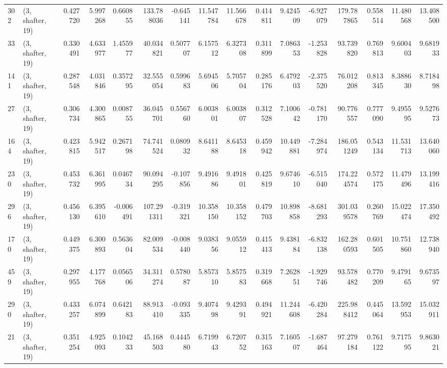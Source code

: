 \begin{tabular}{llrrrrrrrrrrrrrr}
302 &  (3, shafter, 19) &   0.427720 &   5.997268 &   0.660855 &   133.788036 &  -0.645141 &  11.547784 &  11.566678 &  0.414811 &   9.424509 &  -6.927079 &   179.787865 &   0.558514 &  11.480568 &  13.408500 \\
33  &  (3, shafter, 19) &   0.330491 &   4.633977 &   1.455977 &    40.034821 &   0.507707 &   6.157512 &   6.327308 &  0.311899 &   7.086353 &  -1.253828 &    93.739820 &   0.769813 &   9.600403 &   9.681933 \\
141 &  (3, shafter, 19) &   0.287548 &   4.031846 &   0.357295 &    32.555054 &   0.599683 &   5.694506 &   5.705704 &  0.285176 &   6.479203 &  -2.375520 &    76.012208 &   0.813345 &   8.388630 &   8.718498 \\
27  &  (3, shafter, 19) &   0.306734 &   4.300865 &   0.008755 &    36.045701 &   0.556760 &   6.003801 &   6.003807 &  0.312528 &   7.100642 &  -0.781170 &    90.776557 &   0.777090 &   9.495595 &   9.527673 \\
164 &  (3, shafter, 19) &   0.423815 &   5.942517 &   0.267198 &    74.741524 &   0.080932 &   8.641188 &   8.645318 &  0.459942 &  10.449881 &  -7.284974 &   186.051249 &   0.543134 &  11.531713 &  13.640060 \\
230 &  (3, shafter, 19) &   0.453732 &   6.361995 &   0.046734 &    90.094295 &  -0.107856 &   9.491686 &   9.491801 &  0.425819 &   9.674610 &  -6.515040 &   174.224574 &   0.572175 &  11.479496 &  13.199416 \\
296 &  (3, shafter, 19) &   0.456130 &   6.395610 &  -0.006491 &   107.291311 &  -0.319321 &  10.358150 &  10.358152 &  0.479703 &  10.898858 &  -8.681293 &   301.039578 &   0.260769 &  15.022474 &  17.350492 \\
170 &  (3, shafter, 19) &   0.449375 &   6.300893 &   0.563604 &    82.009534 &  -0.008440 &   9.038356 &   9.055912 &  0.415413 &   9.438184 &  -6.832138 &   162.280593 &   0.601505 &  10.751860 &  12.738940 \\
459 &  (3, shafter, 19) &   0.297955 &   4.177768 &   0.056506 &    34.311274 &   0.578087 &   5.857310 &   5.857583 &  0.319668 &   7.262851 &  -1.929746 &    93.578482 &   0.770209 &   9.479165 &   9.673597 \\
290 &  (3, shafter, 19) &   0.433257 &   6.074899 &   0.642183 &    88.913410 &  -0.093335 &   9.407498 &   9.429391 &  0.494921 &  11.244608 &  -6.420284 &   225.988412 &   0.445064 &  13.592953 &  15.032911 \\
21  &  (3, shafter, 19) &   0.351254 &   4.925093 &   0.104233 &    45.168503 &   0.444580 &   6.719943 &   6.720752 &  0.315163 &   7.160507 &  -1.687464 &    97.279184 &   0.761122 &   9.717595 &   9.863021 \\

\end{tabular}
